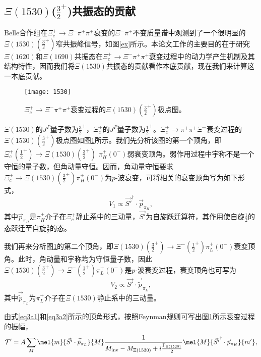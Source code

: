 \subsection{$\Xi(1530)$($\frac{3}{2}^{+}$)共振态的贡献}
\label{subsec1530}
Belle合作组在$\Xi_{c}^{+}\to\Xi^{-}\pi^{+}\pi^{+}$衰变的$\Xi^{-}\pi^{+}$不变质量谱中观测到了一个很明显的$\Xi(1530)(\frac{3}{2}^{+})$窄共振峰信号，如图\ref{ex}所示。本论文工作的主要目的在于研究$\Xi(1620)$和$\Xi(1690)$共振态在$\Xi_{c}^{+}\to\Xi^{-}\pi^{+}\pi^{+}$衰变过程中的动力学产生机制及其结构特性，因而我们将$\Xi(1530)$共振态的贡献看作本底贡献，现在我们来计算这一本底贡献。\par
\begin{figure}[htbp]
	\centering
	\texttt{[image: 1530]}
	\caption[$\Xi(1530)(\frac{3}{2}^{+})$极点图]{$\Xi_{c}^{+}\to\Xi^{-}\pi^{+}\pi^{+}$衰变过程的$\Xi(1530)(\frac{3}{2}^{+})$极点图。}
	\label{1530}
\end{figure}
$\Xi(1530)$的$J^{P}$量子数为$\frac{3}{2}^{+}$，$\Xi_{c}^{+}$的$J^{P}$量子数为$\frac{1}{2}^{+}$。$\Xi_{c}^{+}\to\pi^{+}\pi^{+}\Xi^{-}$衰变过程的$\Xi(1530)(\frac{3}{2}^{+})$极点图如图\ref{1530}所示。我们先分析该图的第一个顶角，即$\Xi_{c}^{+}(\frac{1}{2}^{+})\to\Xi(1530)(\frac{3}{2}^{+})$ $\pi^{+}_{H}(0^{-})$弱衰变顶角。弱作用过程中宇称不是一个守恒的量子数，但角动量守恒。因而，角动量守恒要求$\Xi_{c}^{+}\to\Xi(1530)(\frac{3}{2}^{+})\pi^{+}_{H}(0^{-})$为$p$-波衰变，可将相关的衰变顶角写为如下形式，
\begin{equation}
	\label{eq3a1}
	V_{1}\propto \vec{S'}^{\dagger}\cdot \vec{p}_{\pi_H},
\end{equation}
其中$\vec{p}_{\pi_H}$是$\pi^{+}_{H}$介子在$\Xi_{c}^{+}$静止系中的三动量，$\vec{S'}$为自旋跃迁算符，其作用使自旋$\frac{1}{2}$的态跃迁至自旋$\frac{3}{2}$的态。\par
我们再来分析图\ref{1530}的第二个顶角，即$\Xi(1530)(\frac{3}{2}^{+})\to\Xi^{-}(\frac{1}{2}^{+})\pi_{L}^{+}(0^{-})$衰变顶角。此时，角动量和宇称均为守恒量子数，因此$\Xi(1530)(\frac{3}{2}^{+})\to\Xi^{-}(\frac{1}{2}^{+})\pi^{+}_{L}(0^{-})$是$p$-波衰变过程，衰变顶角也可写为
\begin{equation}
	\label{eq3a2}
	V_{2}\propto \vec{S'}\cdot \vec{\tilde{p}}_{\pi_L},
\end{equation}
其中$\vec{\tilde{p}}_{\pi_L}$为$\pi_{L}^{+}$介子在$\Xi(1530)$静止系中的三动量。\par
由式\eqref{eq3a1}和\eqref{eq3a2}所示的顶角形式，按照Feynman规则可写出图\ref{1530}所示衰变过程的振幅，
\begin{equation}
	\label{eq3a3}
	\mathcal{T}'=A\sum_{M}\mel{m}{\vec{S'}\cdot \vec{\tilde{p}}_{\pi_L}}{M}\frac{1}{M_{\text{inv}}-M_{\Xi(1530)}+i\frac{\Gamma_{\Xi(1530)}}{2}}\mel{M}{\vec{S'}^{\dagger}\cdot \vec{p}_{\pi_H}}{m'},
\end{equation}
